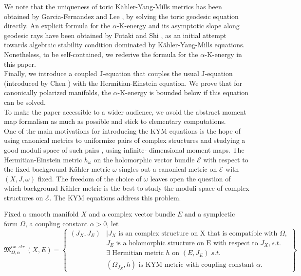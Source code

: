 \documentclass[10pt, letterpaper]{amsart}
\theoremstyle{plain}
\theoremstyle{definition}
\numberwithin{equation}{section}
\begin{document}
\indent We note that the uniqueness of toric K\"ahler-Yang-Mills metrics has been obtained by Garcia-Fernandez and Lee \cite{GF-L}, by solving the toric geodesic equation directly. An explicit formula for the $\alpha$-K-energy and its asymptotic slope along geodesic rays have been obtained by Futaki and Shi \cite{FS}, as an initial attempt towards algebraic stability condition dominated by K\"ahler-Yang-Mills equations. Nonetheless, to be self-contained, we rederive the formula for the $\alpha$-K-energy in this paper.\\
\indent Finally, we introduce a coupled J-equation that couples the usual J-equation (introduced by Chen \cite{XX}) with the Hermitian-Einstein equation.  We prove that for canonically polarized manifolds, the $\alpha$-K-energy is bounded below if this equation can be solved. \\
\indent To make the paper accessible to a wider audience, we avoid the abstract moment map formalism as much as possible and stick to elementary computations.\\
\indent One of the main motivations for introducing the KYM equations is the hope of using canonical metrics to uniformize pairs of complex structures and studying a good moduli space of such pairs \cite{Garcia1}, using infinite- dimensional moment maps. The Hermitian-Einstein metric $h_\omega$ on the holomorphic vector bundle $\mathcal{E}$ with respect to the fixed background K\"ahler metric $\omega$ singles out a canonical metric on $\mathcal{E}$ with $(X,J,\omega)$ fixed. The freedom of the choice of $\omega$ leaves open the question of which background K\"ahler metric is the best to study the moduli space of complex structures on $\mathcal{E}$. The KYM equations address this problem. 

Fixed a smooth manifold $X$ and a complex vector bundle $E$ and a symplectic form $\Omega$, a coupling constant $\alpha>0$, let 
\[
\mathfrak{M}_{\Omega,\alpha}^{cx.\; str.}\left(X,E\right)
= 
\left\{
\begin{array}{ll}
\left(J_X, J_E\right)
& | J_X \text{ is an complex structure on X that is compatible with }\Omega,\\
& J_E \text{ is a holomorphic structure on E with respect to }J_X, s.t.\\
& \exists \text{ Hermitian metric }h\text{ on }\left(E, J_E\right) \; s.t.\\
&  \left(\Omega_{J_X}, h\right) \text{ is KYM metric with coupling constant }\alpha. 
\end{array}
\right\}
\]
\end{document}

